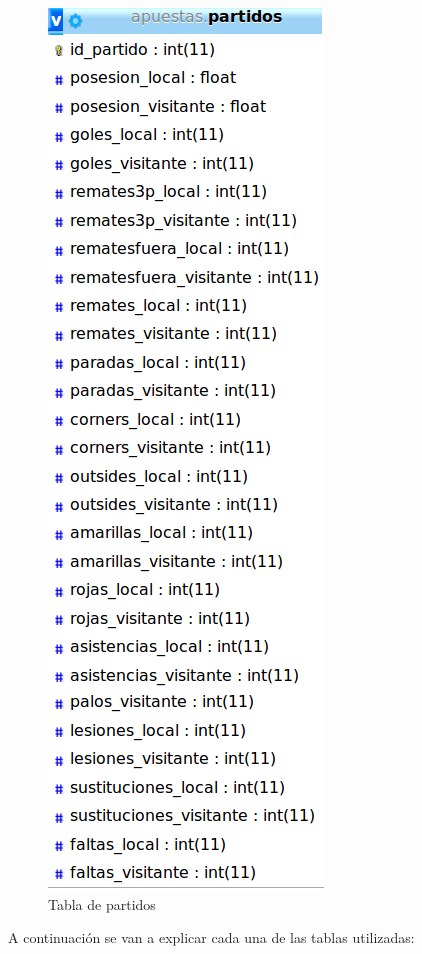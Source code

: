 \begin{figure}
\centering
\includegraphics[width=.5\textwidth]{img/modelo_relacional_partidos}
\caption{Tabla de partidos}
\label{fig:ModRelPar}
\end{figure}

A continuación se van a explicar cada una de las tablas utilizadas:

